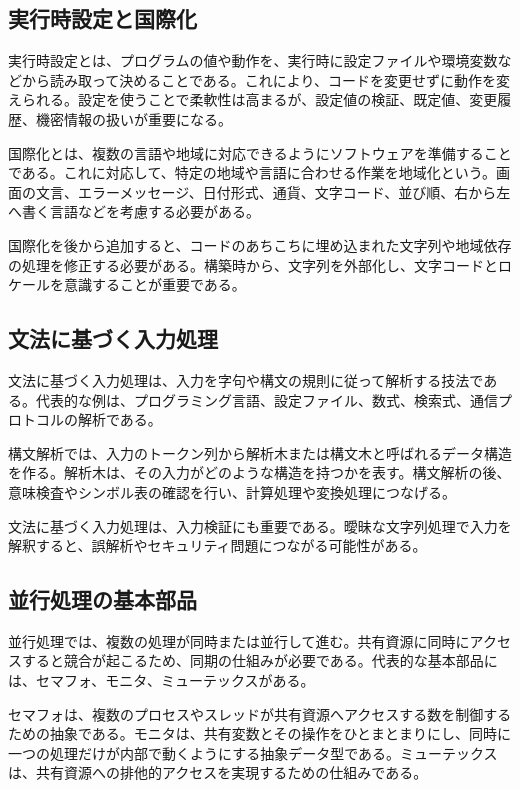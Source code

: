 \documentclass[a4paper,11pt,ja=standard,xelatex]{bxjsarticle}
\begin{document}
\subsection{実行時設定と国際化}

実行時設定とは、プログラムの値や動作を、実行時に設定ファイルや環境変数などから読み取って決めることである。これにより、コードを変更せずに動作を変えられる。設定を使うことで柔軟性は高まるが、設定値の検証、既定値、変更履歴、機密情報の扱いが重要になる。

国際化とは、複数の言語や地域に対応できるようにソフトウェアを準備することである。これに対応して、特定の地域や言語に合わせる作業を地域化という。画面の文言、エラーメッセージ、日付形式、通貨、文字コード、並び順、右から左へ書く言語などを考慮する必要がある。

国際化を後から追加すると、コードのあちこちに埋め込まれた文字列や地域依存の処理を修正する必要がある。構築時から、文字列を外部化し、文字コードとロケールを意識することが重要である。

\subsection{文法に基づく入力処理}

文法に基づく入力処理は、入力を字句や構文の規則に従って解析する技法である。代表的な例は、プログラミング言語、設定ファイル、数式、検索式、通信プロトコルの解析である。

構文解析では、入力のトークン列から解析木または構文木と呼ばれるデータ構造を作る。解析木は、その入力がどのような構造を持つかを表す。構文解析の後、意味検査やシンボル表の確認を行い、計算処理や変換処理につなげる。

文法に基づく入力処理は、入力検証にも重要である。曖昧な文字列処理で入力を解釈すると、誤解析やセキュリティ問題につながる可能性がある。

\subsection{並行処理の基本部品}

並行処理では、複数の処理が同時または並行して進む。共有資源に同時にアクセスすると競合が起こるため、同期の仕組みが必要である。代表的な基本部品には、セマフォ、モニタ、ミューテックスがある。

セマフォは、複数のプロセスやスレッドが共有資源へアクセスする数を制御するための抽象である。モニタは、共有変数とその操作をひとまとまりにし、同時に一つの処理だけが内部で動くようにする抽象データ型である。ミューテックスは、共有資源への排他的アクセスを実現するための仕組みである。
\end{document}
